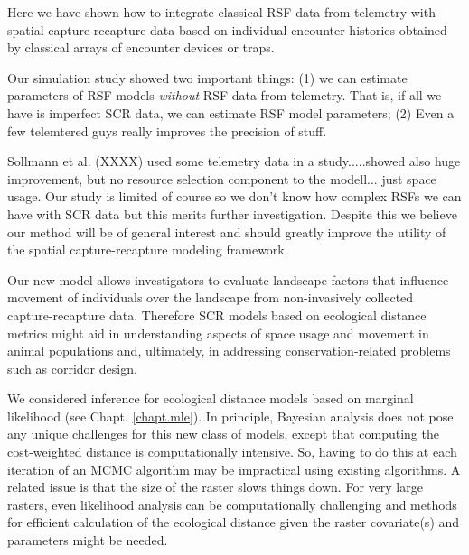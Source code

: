 Here we have shown how to integrate classical RSF data from telemetry
with spatial capture-recapture data based on individual encounter
histories obtained by classical arrays of encounter devices or traps.



Our simulation study showed two important things:
(1) we can estimate parameters of RSF models {\it without} RSF data
from telemetry. That is, if all we have is imperfect SCR data, we can
estimate RSF model parameters;
(2) Even a few telemtered guys really
improves the precision of stuff.

Sollmann et al. (XXXX) used some telemetry data in a study.....showed
also huge improvement, but no resource selection component to the
modell... just space usage.
Our study is limited of course so we don't know how complex RSFs we
can have with SCR data but this merits further investigation. Despite
this we believe our method will be of general interest and should
greatly improve the utility of the spatial capture-recapture modeling
framework.


Our new model allows
investigators to evaluate landscape factors that influence movement of
individuals over the landscape from non-invasively collected
capture-recapture data.  Therefore SCR models based on ecological
distance metrics might aid in understanding
aspects of space usage and movement in animal populations and, ultimately, in addressing conservation-related problems such as corridor design.

We considered inference for ecological distance models based on
marginal likelihood \citep{borchers_efford:2008}
(see Chapt. \ref{chapt.mle}).
In principle,
Bayesian analysis does not pose any unique challenges for this new
class of models, except that computing the cost-weighted distance is
computationally intensive.  So, having to do this at each iteration of
an MCMC algorithm may be impractical using existing algorithms.  A
related issue is that the size of the raster slows things down. For
very large rasters, even likelihood analysis can be computationally
challenging and methods for efficient calculation of the ecological
distance given the raster covariate(s) and parameters might be needed.






























